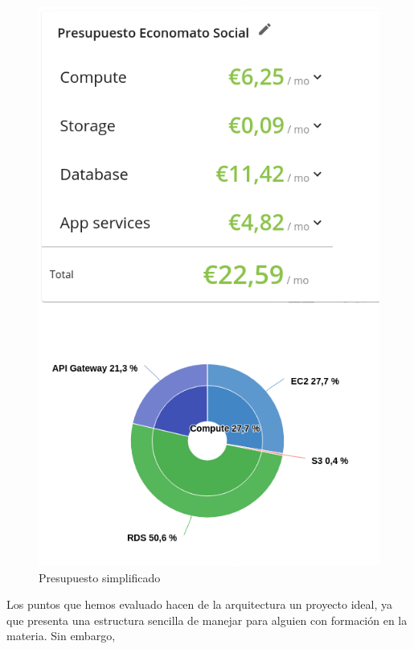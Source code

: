 \clearpage
\begin{figure}[h]
\centering
\includegraphics[scale=0.6]{archivos/budgetAws.png}
\caption{Presupuesto simplificado}
\end{figure}
\clearpage
\par Los puntos que hemos evaluado hacen de la arquitectura un proyecto ideal, ya que presenta una estructura sencilla de manejar para alguien con formación en la materia. Sin embargo, 
